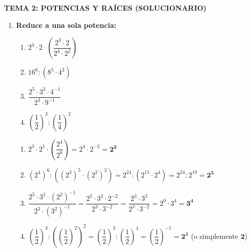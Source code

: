 \documentclass[a4paper,12pt]{article}
\begin{document}
\begin{center}
    \Large\textbf{\color{primary} TEMA 2: POTENCIAS Y RAÍCES (SOLUCIONARIO)}
\end{center}

\begin{enumerate}

    \item \textbf{Reduce a una sola potencia:}
        \begin{enumerate}[label=\alph*)]
            \item $2^{3} \cdot 2 \cdot \left(\dfrac{2^{3} \cdot 2}{2^{4} \cdot 2^{2}}\right)$
            \item $16^{6} : (8^{5} \cdot 4^{2})$
            \item $\dfrac{2^{5} \cdot 3^{2} \cdot 4^{-1}}{2^{3} \cdot 9^{-1}}$
            \item $\left(\dfrac{1}{2}\right)^{3} : \left(\dfrac{1}{4}\right)^{2}$
        \end{enumerate}
        \begin{solucion}
            \begin{enumerate}[label=\alph*)]
                \item $2^{3} \cdot 2^{1} \cdot \left(\dfrac{2^{4}}{2^{6}}\right) = 2^{4} \cdot 2^{-2} = \mathbf{2^{2}}$
                \item $(2^{4})^{6} : \left((2^{3})^{5} \cdot (2^{2})^{2}\right) = 2^{24} : (2^{15} \cdot 2^{4}) = 2^{24} : 2^{19} = \mathbf{2^{5}}$
                \item $\dfrac{2^{5} \cdot 3^{2} \cdot (2^{2})^{-1}}{2^{3} \cdot (3^{2})^{-1}} = \dfrac{2^{5} \cdot 3^{2} \cdot 2^{-2}}{2^{3} \cdot 3^{-2}} = \dfrac{2^{3} \cdot 3^{2}}{2^{3} \cdot 3^{-2}} = 2^{0} \cdot 3^{4} = \mathbf{3^{4}}$
                \item $\left(\dfrac{1}{2}\right)^{3} : \left(\left(\dfrac{1}{2}\right)^{2}\right)^{2} = \left(\dfrac{1}{2}\right)^{3} : \left(\dfrac{1}{2}\right)^{4} = \left(\dfrac{1}{2}\right)^{-1} = \mathbf{2^{1}}$ (o simplemente $\mathbf{2}$)
            \end{enumerate}
        \end{solucion}


\end{enumerate}
\end{document}
